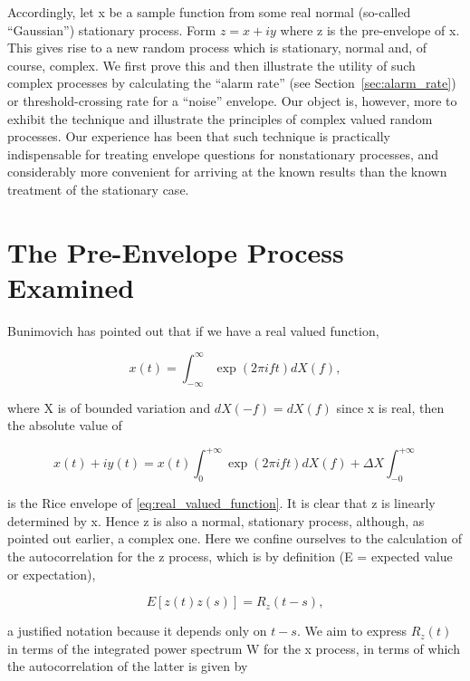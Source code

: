\documentclass[10pt,twocolumn]{article}
\theoremstyle{definition}
\begin{document}
Accordingly, let x be a sample function from some real normal (so-called ``Gaussian'') stationary process. Form $z = x + iy$ where z is the pre-envelope of x. This gives rise to a new random process which is stationary, normal and, of course, complex. We first prove this and then illustrate the utility of such complex processes by calculating the ``alarm rate'' (see Section~\ref{sec:alarm_rate}) or threshold-crossing rate for a ``noise'' envelope. Our object is, however, more to exhibit the technique and illustrate the principles of complex valued random processes. Our experience has been that such technique is practically indispensable for treating envelope questions for nonstationary processes, and considerably more convenient for arriving at the known results than the known treatment of the stationary case.

\section{The Pre-Envelope Process Examined}
\label{sec:pre_envelope_process}

Bunimovich\cite{bunimovich} has pointed out that if we have a real valued function,

\begin{equation}
\label{eq:real_valued_function}
x(t) = \int_{-\infty}^{\infty} \exp (2\pi ift) dX(f),
\end{equation}

where X is of bounded variation and $dX(-f) = dX(f)$ since x is real, then the absolute value of

\begin{equation}
\label{eq:complex_form}
x(t) + iy(t) = x(t) \int_{0}^{+\infty} \exp (2\pi ift) dX(f) + \Delta X \int_{-0}^{+\infty}
\end{equation}

is the Rice\cite{rice} envelope of \eqref{eq:real_valued_function}. It is clear that z is linearly determined by x. Hence z is also a normal, stationary process, although, as pointed out earlier, a complex one. Here we confine ourselves to the calculation of the autocorrelation for the z process, which is by definition (E = expected value or expectation),

\begin{equation}
\label{eq:autocorrelation}
E[z(t)z(s)] = R_z(t - s),
\end{equation}

a justified notation because it depends only on $t - s$. We aim to express $R_z(t)$ in terms of the integrated power spectrum W for the x process, in terms of which the autocorrelation of the latter is given by
\end{document}
